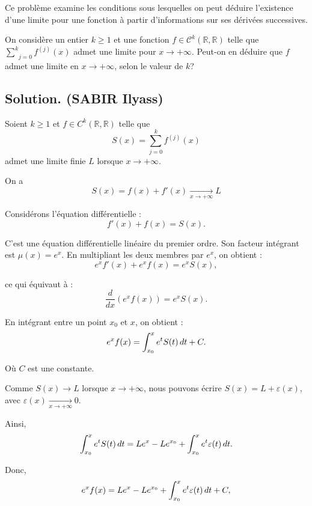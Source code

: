 Ce probl{\`e}me examine les conditions sous lesquelles on peut d{\'e}duire
l'existence d'une limite pour une fonction {\`a} partir d'informations sur ses
d{\'e}riv{\'e}es successives.
\begin{exercise}[]
On consid{\`e}re un entier $k \geqslant 1$ et une fonction $f \in
\mathcal{C}^k (\mathbb{R}, \mathbb{R})$ telle que $\underset{j =
0}{\overset{k}{\sum}} f^{(j)} (x)$ admet une limite pour $x \rightarrow +
\infty$. Peut-on en d{\'e}duire que $f$ admet une limite en $x \rightarrow +
\infty$, selon le valeur de $k$?
\end{exercise}

\subsection*{Solution. (SABIR Ilyass)}


Soient $k \geq 1$ et $f \in C^k (\mathbb{R}, \mathbb{R})$ telle que
\[ S (x) = \sum_{j = 0}^k f^{(j)} (x) \]
admet une limite finie $L$ lorsque $x \to + \infty$.


On a
\[ S (x) = f (x) + f' (x) \underset{x \to + \infty}{\to} L \]


Consid{\'e}rons l'{\'e}quation diff{\'e}rentielle :
\[ f' (x) + f (x) = S (x) . \]


C'est une {\'e}quation diff{\'e}rentielle lin{\'e}aire du premier ordre. Son
facteur int{\'e}grant est $\mu (x) = e^x$. En multipliant les deux membres par
$e^x$, on obtient :
\[ e^x f' (x) + e^x f (x) = e^x S (x), \]


ce qui {\'e}quivaut {\`a} :
\[ \frac{d}{dx} (e^x f (x)) = e^x S (x) . \]


En int{\'e}grant entre un point $x_0$ et $x$, on obtient :
\[ e^x f (x) = \int_{x_0}^x e^t S (t) \hspace{0.17em} dt + C. \]


O{\`u} $C$ est une constante.

Comme $S (x) \to L$ lorsque $x \to + \infty$, nous pouvons {\'e}crire $S (x) =
L + \varepsilon (x)$, avec $\varepsilon (x) \underset{x \rightarrow +
\infty}{\to} 0$.

Ainsi,
\[ \int_{x_0}^x e^t S (t) \hspace{0.17em} dt = Le^x - Le^{x_0} + \int_{x_0}^x
   e^t \varepsilon (t) \hspace{0.17em} dt. \]


Donc,
\[ e^x f (x) = Le^x - Le^{x_0} + \int_{x_0}^x e^t \varepsilon (t)
   \hspace{0.17em} dt + C, \]


